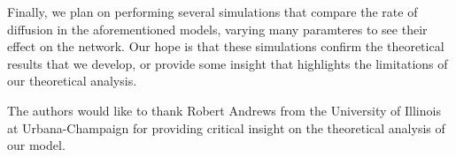 \documentclass[format=acmsmall, review=false]{acmart}
\begin{document}
\par Finally, we plan on performing several simulations that compare the rate of diffusion in the aforementioned models,
varying many paramteres to see their effect on the network. Our hope is that these simulations confirm the theoretical
results that we develop, or provide some insight that highlights the limitations of our theoretical analysis.


\begin{acks}
	
	The authors would like to thank Robert Andrews from the University of
	Illinois at Urbana-Champaign for providing critical insight on the
	theoretical analysis of our model.
	
\end{acks}



\end{document}
